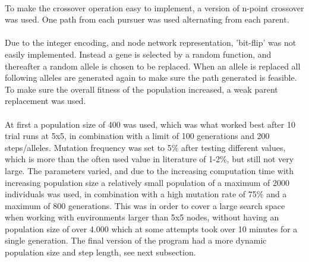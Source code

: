 \\To make the crossover operation easy to implement, a version of n-point crossover was used. One path from each pursuer was used alternating from each parent.\\
\\Due to the integer encoding, and node network representation, 'bit-flip' was not easily implemented. Instead a gene is selected by a random function, and thereafter a random allele is chosen to be replaced. When an allele is replaced all following alleles are generated again to make sure the path generated is feasible.
\\To make sure the overall fitness of the population increased, a weak parent replacement was used.\\
\\At first a population size of 400 was used, which was what worked best after 10 trial runs at 5x5, in combination with a limit of 100 generations and 200 steps/alleles. Mutation frequency was set to 5\% after testing different values, which is more than the often used value in literature \cite{GAHandbook2} of 1-2\%, but still not very large. The parameters varied, and due to the increasing computation time with increasing population size a relatively small population of a maximum of 2000 individuals was used, in combination with a high mutation rate of 75\% and a maximum of 800 generations. This was in order to cover a large search space when working with environments larger than 5x5 nodes, without having an population size of over 4.000 which at some attempts took over 10 minutes for a single generation. The final version of the program had a more dynamic population size and step length, see next subsection.

